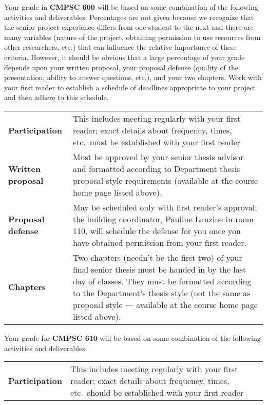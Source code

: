 \begin{description}
Your grade in {\bf CMPSC 600} will be based on some combination of the following
activities and deliverables. Percentages are not given because we
recognize that the senior project experience differs from one student to the
next and there are many variables (nature of the project, obtaining
permission to use resources from other researchers, etc.) that can
influence the relative importance of these criteria. However, it should be
obvious that a large percentage of your grade depends upon
your written proposal, your proposal defense (quality of 
the presentation, ability to answer questions, etc.), and your two chapters.
Work with your first
reader to establish a schedule of deadlines appropriate 
to your project and then adhere to this schedule.
\begin{center}
\begin{tabular}{lp{4in}}
\bf Participation & This includes meeting regularly with your first
reader; exact details about frequency, times, etc.\ must be established with 
your first reader\\

\bf Written proposal & Must be approved by your senior thesis advisor and
formatted according to Department thesis proposal style requirements
(available at the course home page listed above).\\

\bf Proposal defense & May be scheduled only with first reader's approval;
the building coordinator, Pauline Lanzine in room 110, 
will schedule the defense for you once you have obtained
permission from your first reader.\\

\bf Chapters & Two chapters (needn't be the first two) of 
your final senior thesis must be handed in
by the last day of classes. 
They must be formatted according to
the Department's thesis style (not the same as proposal style --- available
at the course home page listed above). 

\end{tabular}
\end{center}

Your grade for {\bf CMPSC 610} will be based on 
some combination of the following activities and deliverables:
\begin{center}
\begin{tabular}{lp{4in}}
\bf Participation & This includes meeting regularly with your first
reader; exact details about frequency, times, etc.\ should be established with 
your first reader\\


\end{tabular}
\end{center}
\end{description}
